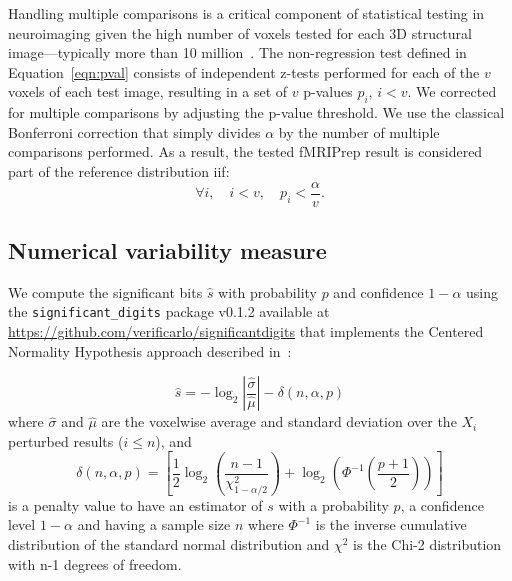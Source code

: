 \documentclass{article}
\newcommand{\fmriprep}{fMRIPrep \xspace}
\begin{document}
Handling multiple comparisons is a critical component of statistical testing in
neuroimaging given the high number of voxels tested for each 3D structural
image---typically more than 10 million~\cite{NICHOLS2007246}. The non-regression
test defined in Equation~\ref{eqn:pval} consists of independent z-tests performed
for each of the $v$ voxels of each test image, resulting in a set of $v$
p-values $p_i$, $i < v$. We corrected for multiple comparisons by adjusting the p-value
threshold. We use the classical Bonferroni correction that simply divides
$\alpha$ by the number of multiple comparisons performed. As a result, the
tested \fmriprep result is considered part of the reference distribution iif:
\begin{equation}
    \label{eq:bonferroni}
    \forall i, \quad i < v, \quad p_i < \frac{\alpha}{v}.
\end{equation}



\subsection*{Numerical variability measure}

We compute the significant bits $\hat{s}$ with probability $p$ and confidence $1-\alpha$
using the \texttt{significant\_digits} package
v0.1.2 available at \url{https://github.com/verificarlo/significantdigits} that
implements the Centered Normality Hypothesis approach described in~\cite{sohier2021confidence}:

\[
    \hat{s} = -\log_2 \left| \frac{\hat{\sigma}}{\hat{\mu}} \right| - \delta(n, \alpha, p)
\]
where $\hat{\sigma}$ and $\hat{\mu}$ are the voxelwise average and standard
deviation over the $X_i$ perturbed results ($i \leq n$),
and
\[
    \delta(n, \alpha, p) =
    \left[
        \frac{1}{2} \log_2 \left( \frac{n-1}{\chi^2_{1-\alpha/2}} \right) +
        \log_2 \left( \Phi^{-1} \left( \frac{p+1}{2} \right) \right)
        \right]
\]
is a penalty value to have an estimator of $s$ with a probability $p$, a confidence level $1-\alpha$ and
having a sample size $n$ where $\Phi^{-1}$ is the inverse cumulative distribution of the standard normal distribution
and $\chi^2$ is the Chi-2 distribution with n-1 degrees of freedom.
\end{document}
